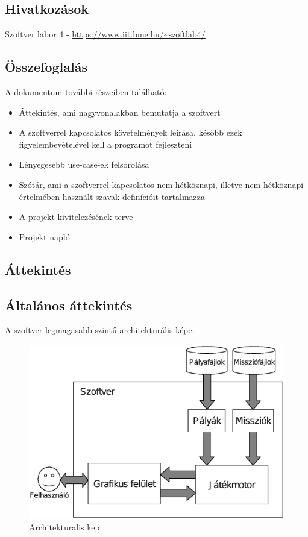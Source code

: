 \subsection{Hivatkozások}
Szoftver labor 4 - \url{https://www.iit.bme.hu/~szoftlab4/}

\subsection{Összefoglalás}
A dokumentum további részeiben található:
\begin{itemize}
\item Áttekintés, ami nagyvonalakban bemutatja a szoftvert
\item A szoftverrel kapcsolatos követelmények leírása, később ezek figyelembevételével kell a programot fejleszteni
\item Lényegesebb use-case-ek felsorolása
\item Szótár, ami a szoftverrel kapcsolatos nem hétköznapi, illetve nem hétköznapi értelmében használt szavak definícióit tartalmazza
\item A projekt kivitelezésének terve
\item Projekt napló
\end{itemize}

\begin{nopb}
\section{Áttekintés}
\subsection{Általános áttekintés}


A szoftver legmagasabb szintű architekturális képe:
\newline
\begin{figure}[H]
\centering
\includegraphics[scale=.7]{images/arch.eps}
\caption{Architekturalis kep}
\label{overflow}
\end{figure}
\end{nopb}

